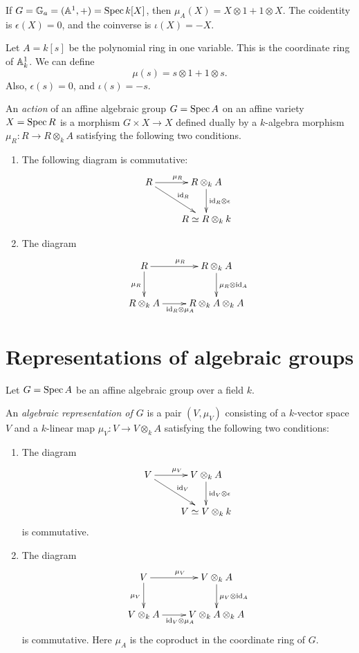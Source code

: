 \documentclass[11pt, english]{article}
\begin{document}
\begin{example}
If $G=\mathbb{G}_a=(\mathbb{A}^1,+)=\operatorname{Spec} k[X]$, then $\mu_A(X)=X \otimes 1 + 1 \otimes X$. The coidentity is $\epsilon(X)=0$, and the coinverse is $\iota(X)=-X$.
\end{example}

\begin{example}
 Let $A=k[s]$ be the polynomial ring in one variable. This is the coordinate ring of $\mathbb{A}_k^1$. We can define 
$$
\mu(s) = s \otimes 1 + 1 \otimes s.
$$
Also, $\epsilon(s)=0$, and $\iota(s)=-s$. 
\end{example}


\begin{defi}
\label{defaction}
An \emph{action} of an affine algebraic group $G = \operatorname{Spec} A$ on an affine variety $X= \operatorname{Spec} R$ is a morphism $G \times X \to X$ defined dually by a $k$-algebra morphism $\mu_R : R \to R \otimes_k A$ satisfying the following two conditions.
\begin{enumerate}
\item  The following diagram is commutative:
\[
\xymatrix{
R \ar[dr]^{\id_R} \ar[r]^{\mu_R} & R \otimes_k A \ar[d]^{\id_R \otimes \epsilon} \\
 & R \simeq R \otimes_k k
}
\]
\item The diagram
\[
\xymatrix{
R \ar[r]^{\mu_R} \ar[d]_{\mu_R} & R \otimes_k A \ar[d]^{\mu_R \otimes \id_A} \\
R \otimes_k A \ar[r]_{\id_R \otimes \mu_A} & R \otimes _k A \otimes_k A
}
\]
\end{enumerate}
\end{defi}


\section{Representations of algebraic groups}

Let $G = \operatorname{Spec} A$ be an affine algebraic group over a field $k$. 

\begin{defi}
 An \emph{algebraic representation of $G$} is a pair $(V,\mu_V)$ consisting of a $k$-vector space $V$ and a $k$-linear map $\mu_V: V \to V \otimes_k A$ satisfying the following two conditions:
 \begin{enumerate}
 \item The diagram
\begin{equation}
\label{eq:algrep1}
\xymatrix{
V \ar[dr]^{\id_V} \ar[r]^{\mu_V} & V \otimes_k A \ar[d]^{\id_V \otimes \epsilon} \\
 & V \simeq V \otimes_k k
}
\end{equation}
is commutative.
\item The diagram
\[
\xymatrix{
V \ar[r]^{\mu_V} \ar[d]_{\mu_V} & V \otimes_k A \ar[d]^{\mu_V \otimes \id_A} \\
V \otimes_k A \ar[r]_{\id_V \otimes \mu_A} & V \otimes _k A \otimes_k A
}
\]
is commutative. Here $\mu_A$ is the coproduct in the coordinate ring of $G$.
 \end{enumerate}
\end{defi}
\end{document}
